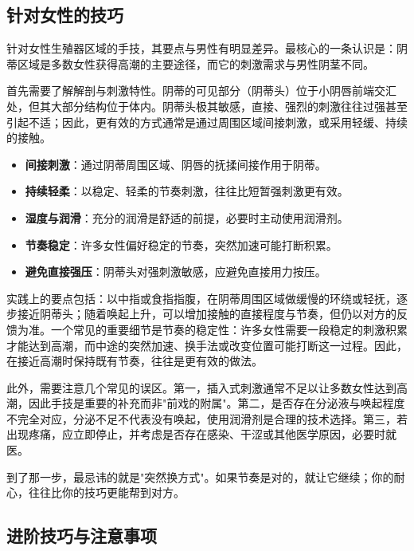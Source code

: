 \documentclass[12pt,UTF8]{ctexbook}
\newcommand{\keyword}[1]{\textbf{#1}}
\begin{document}
\subsection{针对女性的技巧}

针对女性生殖器区域的手技，其要点与男性有明显差异。最核心的一条认识是：阴蒂区域是多数女性获得高潮的主要途径，而它的刺激需求与男性阴茎不同。

首先需要了解解剖与刺激特性。阴蒂的可见部分（阴蒂头）位于小阴唇前端交汇处，但其大部分结构位于体内。阴蒂头极其敏感，直接、强烈的刺激往往过强甚至引起不适；因此，更有效的方式通常是通过周围区域间接刺激，或采用轻缓、持续的接触。

\begin{itemize}
  \item \keyword{间接刺激}：通过阴蒂周围区域、阴唇的抚揉间接作用于阴蒂。
  \item \keyword{持续轻柔}：以稳定、轻柔的节奏刺激，往往比短暂强刺激更有效。
  \item \keyword{湿度与润滑}：充分的润滑是舒适的前提，必要时主动使用润滑剂。
  \item \keyword{节奏稳定}：许多女性偏好稳定的节奏，突然加速可能打断积累。
  \item \keyword{避免直接强压}：阴蒂头对强刺激敏感，应避免直接用力按压。
\end{itemize}

实践上的要点包括：以中指或食指指腹，在阴蒂周围区域做缓慢的环绕或轻抚，逐步接近阴蒂头；随着唤起上升，可以增加接触的直接程度与节奏，但仍以对方的反馈为准。一个常见的重要细节是节奏的稳定性：许多女性需要一段稳定的刺激积累才能达到高潮，而中途的突然加速、换手法或改变位置可能打断这一过程。因此，在接近高潮时保持既有节奏，往往是更有效的做法。

此外，需要注意几个常见的误区。第一，插入式刺激通常不足以让多数女性达到高潮，因此手技是重要的补充而非"前戏的附属"。第二，是否存在分泌液与唤起程度不完全对应，分泌不足不代表没有唤起，使用润滑剂是合理的技术选择。第三，若出现疼痛，应立即停止，并考虑是否存在感染、干涩或其他医学原因，必要时就医。

\begin{tcolorbox}[colback=pink!5!white,colframe=red!50!black,title=贴心小叮咛]
到了那一步，最忌讳的就是"突然换方式"。如果节奏是对的，就让它继续；你的耐心，往往比你的技巧更能帮到对方。
\end{tcolorbox}
\subsection{进阶技巧与注意事项}
\end{document}
